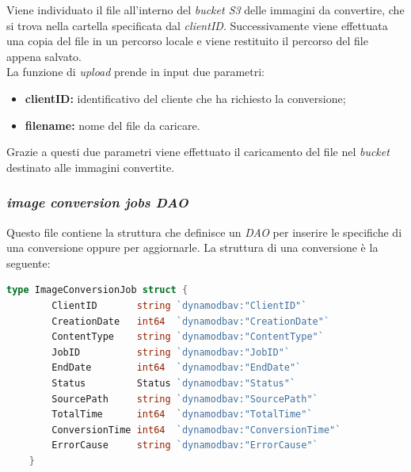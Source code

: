 Viene individuato il file all'interno del \emph{bucket S3} delle immagini da convertire, che si trova nella
cartella specificata dal \emph{clientID}. Successivamente viene effettuata una
copia del file in un percorso locale e viene restituito il percorso del file
appena salvato.\\

La funzione di \emph{upload} prende in input due parametri:
\begin{itemize}
    \item \textbf{clientID:} identificativo del cliente che ha richiesto la
          conversione;
    \item \textbf{filename:} nome del file da caricare.
\end{itemize}
Grazie a questi due parametri viene effettuato il caricamento del file nel
\emph{bucket} destinato alle immagini convertite.

\subsubsection{\emph{image conversion jobs DAO}}

Questo file contiene la struttura che definisce un \emph{DAO} per inserire le
specifiche di una conversione oppure per aggiornarle. La struttura di una
conversione è la seguente:
\begin{lstlisting}[language=go]
    type ImageConversionJob struct {
        ClientID       string `dynamodbav:"ClientID"`
        CreationDate   int64  `dynamodbav:"CreationDate"`
        ContentType    string `dynamodbav:"ContentType"`
        JobID          string `dynamodbav:"JobID"`
        EndDate        int64  `dynamodbav:"EndDate"`
        Status         Status `dynamodbav:"Status"`
        SourcePath     string `dynamodbav:"SourcePath"`
        TotalTime      int64  `dynamodbav:"TotalTime"`
        ConversionTime int64  `dynamodbav:"ConversionTime"`
        ErrorCause     string `dynamodbav:"ErrorCause"`
    }
\end{lstlisting}

